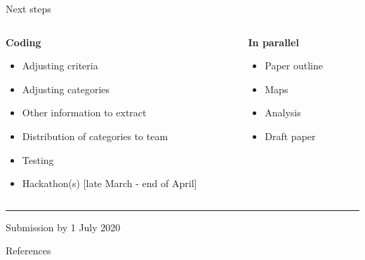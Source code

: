 \documentclass[9pt]{beamer}
\begin{document}
\begin{frame}{Next steps}

\begin{columns}[t]
	\begin{column}{0.5\linewidth}
		\textbf{Coding}
		\begin{itemize}
			\item Adjusting criteria
			\item Adjusting categories
			\item Other information to extract
			\item Distribution of categories to team
			\item Testing
			\item Hackathon(s) [late March - end of April]
		\end{itemize}
	\end{column}
	\begin{column}{0.5\linewidth}
		\textbf{In parallel}
		\begin{itemize}
			\item Paper outline
			\item Maps
			\item Analysis
			\item Draft paper
		\end{itemize}
	\end{column}
\end{columns}

\medskip

\hrule

\medskip

Submission by 1 July 2020

\end{frame}



\begin{frame}{References}

\end{frame}
\end{document}
